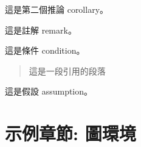 \documentclass[
    writingLanguage=chinese, %
    addPageTitle=on,  %
    addDeclaration=on, %
    addMUSTlog=on, %
    addFigTOC=on, %
    addTabTOC=on, %
    refIndent=off, %
    printMod=off, %
]{must}
\begin{document}
\begin{corollary}
這是第二個推論 corollary。
\end{corollary}

\begin{remark}
這是註解 remark。
\end{remark}



\begin{condition}
這是條件 condition。
\end{condition}

 \begin{quote}
     這是一段引用的段落
 \end{quote}

\begin{assumption}
這是假設 assumption。
\end{assumption}





\chapter{示例章節: 圖環境}
\end{document}
